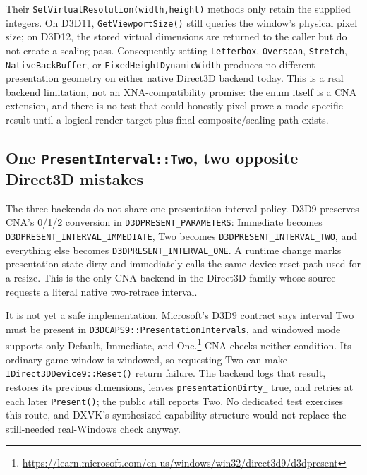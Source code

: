 Their \texttt{SetVirtualResolution(width,height)} methods only retain the supplied integers.
On D3D11, \texttt{GetViewportSize()} still queries the window's physical pixel size; on D3D12,
the stored virtual dimensions are returned to the caller but do not create a scaling pass.
Consequently setting \texttt{Letterbox}, \texttt{Overscan}, \texttt{Stretch},
\texttt{NativeBackBuffer}, or \texttt{FixedHeightDynamicWidth} produces no different
presentation geometry on either native Direct3D backend today. This is a real backend limitation,
not an XNA-compatibility promise: the enum itself is a CNA extension, and there is no test that
could honestly pixel-prove a mode-specific result until a logical render target plus final
composite/scaling path exists.

\subsection{One \texttt{PresentInterval::Two}, two opposite Direct3D mistakes}

The three backends do not share one presentation-interval policy. D3D9 preserves CNA's
0/1/2 conversion in \texttt{D3DPRESENT\_}\allowbreak\texttt{PARAMETERS}: Immediate becomes
\texttt{D3DPRESENT\_}\allowbreak\texttt{INTERVAL\_}\allowbreak\texttt{IMMEDIATE}, Two becomes
\texttt{D3DPRESENT\_}\allowbreak\texttt{INTERVAL\_}\allowbreak\texttt{TWO}, and everything
else becomes \texttt{D3DPRESENT\_}\allowbreak\texttt{INTERVAL\_}\allowbreak\texttt{ONE}.
A runtime change marks presentation state dirty and
immediately calls the same device-reset path used for a resize. This is the only CNA backend
in the Direct3D family whose source requests a literal native two-retrace interval.

It is not yet a safe implementation. Microsoft's D3D9 contract says interval Two must be
present in \texttt{D3DCAPS9::PresentationIntervals}, and windowed mode supports only Default,
Immediate, and One.\footnote{\url{https://learn.microsoft.com/en-us/windows/win32/direct3d9/d3dpresent}}
CNA checks neither condition. Its ordinary game window is windowed, so requesting Two can
make \texttt{IDirect3DDevice9::Reset()} return failure. The backend logs that result, restores
its previous dimensions, leaves \texttt{presentationDirty\_} true, and retries at each later
\texttt{Present()}; the public  still reports Two. No
dedicated test exercises this route, and DXVK's synthesized capability structure would not
replace the still-needed real-Windows check anyway.

